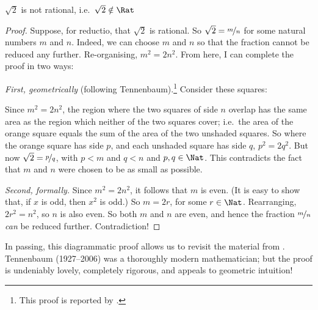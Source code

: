 \documentclass[../../../include/open-logic-section]{subfiles}
\begin{document}
\begin{thm}
	$\sqrt{2}$ is not rational, i.e.\ $\sqrt{2} \notin \Rat$
	\begin{proof}
		Suppose, for reductio, that $\sqrt{2}$ is rational. So $\sqrt{2} = \nicefrac{m}{n}$ for some natural numbers $m$ and $n$. Indeed, we can choose $m$ and $n$ so that the fraction cannot be reduced any further. Re-organising, $m^{2} = 2n^{2}$. From here, I can complete the proof in two ways:
		
		\emph{First, geometrically} (following Tennenbaum).\footnote{This proof is reported by \cite{Conway2006}.} Consider these squares:
		\begin{center}	
		\end{center}
		Since $m^2 = 2n^2$, the region where the two squares of side $n$ overlap has the same area as the region which neither of the two squares cover; i.e.\ the area of the orange square equals the sum of the area of the two unshaded squares. So where the orange square has side $p$, and each unshaded square has side $q$, $p^2 = 2q^2$. But now $\sqrt{2} = \nicefrac{p}{q}$, with $p < m$ and $q < n$ and $p, q \in \Nat$. This contradicts the fact that $m$ and $n$ were chosen to be as small as possible.
		
		\emph{Second, formally.} Since $m^{2} = 2n^{2}$, it follows that $m$ is even. (It is easy to show that, if $x$ is odd, then $x^2$ is odd.) So $m = 2r$, for some $r \in \Nat$. Rearranging, $2r^2 = n^2$, 
		so $n$ is also even. So both $m$ and $n$ are even, and hence the fraction $\nicefrac{m}{n}$ \emph{can} be reduced further. Contradiction!
	\end{proof}
\end{thm}\noindent
In passing, this diagrammatic proof allows us to revisit the material from . Tennenbaum (1927--2006) was a thoroughly modern mathematician; but the proof is undeniably lovely, completely rigorous, and appeals to geometric intuition!
\end{document}
